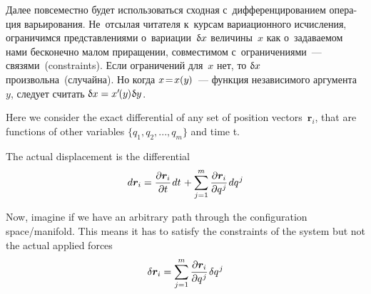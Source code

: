 
\begin{otherlanguage}{russian}

Далее повсеместно будет использоваться сходная с~дифференцированием операция варьирования. Не~отсылая читателя к~курсам вариационного исчисления, ограничимся представлениями о~вариации~${\updelta\hspace{-0.1ex}x}$ величины~$x$ как о~задаваемом нами бесконечно малом приращении, совместимом с~ограничениями~--- связями~(constraints). Если ограничений для~$x$ нет, то ${\updelta\hspace{-0.1ex}x}$ произвольна~(случайна). Но когда ${x \!=\! x(y\hspace{-0.1ex})}$~--- функция независимого аргумента~$y$, следует считать ${\updelta\hspace{-0.1ex}x = x'\hspace{-0.25ex}(y\hspace{-0.1ex}) \hspace{0.1ex} \updelta\hspace{-0.1ex}y}$.



{\small
\setlength{\abovedisplayskip}{2pt}\setlength{\belowdisplayskip}{2pt}

Here we consider the exact differential of any set of position vectors~$\bm{r}_i$, that are functions of other variables ${\displaystyle \lbrace q_{1},q_{2},...,q_{m}\rbrace }$ and time t.

The actual displacement is the differential
\[\displaystyle d\bm{r}_{i} = \frac{\partial \bm{r}_{i}}{\partial t} \hspace{.16ex} dt \hspace{.2ex} + \sum_{j=1}^{m} {\frac{\partial \bm{r}_{i}}{\partial q^{\hspace{.1ex}j}}} \hspace{.2ex} dq^{\hspace{.1ex}j}\]

Now, imagine if we have an arbitrary path through the configuration space/manifold. This means it has to satisfy the constraints of the system but not the actual applied forces
\[\displaystyle \delta \bm{r}_{i}=\sum _{j=1}^{m} {\frac {\partial \bm{r}_{i}}{\partial q^{\hspace{.1ex}j}}} \hspace{.2ex} \delta q^{\hspace{.1ex}j}\]

}
\end{otherlanguage}
